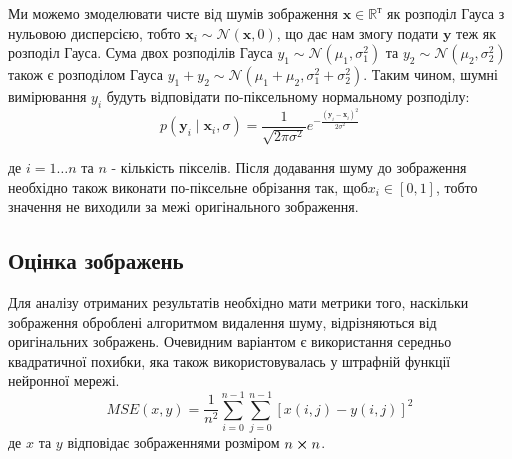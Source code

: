 \documentclass[14pt,a4paper]{extarticle}
\newcounter{e}
\numberwithin{equation}{section}
\numberwithin{figure}{section}
\begin{document}
	Ми можемо змоделювати чисте від шумів зображення $\mathbf{x} \in \mathbb{R}^{т}$ як розподіл Гауса з нульовою дисперсією, тобто $\mathbf{x}_{i} \sim \mathcal{N}(\mathbf{x}, 0)$, що дає нам змогу подати $\mathbf{y}$ теж як розподіл Гауса. Сума двох розподілів Гауса $y_{1} \sim \mathcal{N}\left(\mu_{1}, \sigma_{1}^{2}\right)$ та $y_{2} \sim \mathcal{N}\left(\mu_{2}, \sigma_{2}^{2}\right)$ також є розподілом Гауса $y_{1}+y_{2} \sim \mathcal{N}\left(\mu_{1}+\mu_{2}, \sigma_{1}^{2}+\sigma_{2}^{2}\right)$. Таким чином, шумні  вимірювання $y_{i}$ будуть відповідати по-піксельному нормальному розподілу:
	\begin{equation}
		p\left(\mathbf{y}_{i} \mid \mathbf{x}_{i}, 		\sigma\right)=\frac{1}{\sqrt{2 \pi \sigma^{2}}} e^{-\frac{\left(\mathbf{y}_{i}-\mathbf{x}_{i}\right)^{2}}{2 \sigma^{2}}}
	\end{equation}
	
	де $i = 1\dotsc n$ та $n$ - кількість пікселів. Після додавання шуму до зображення необхідно також виконати по-піксельне обрізання так, щоб$x_i \in [0, 1]$, тобто значення не виходили за межі оригінального зображення.
	
	\subsection{Оцінка зображень}
	Для аналізу отриманих результатів необхідно мати метрики того, наскільки зображення оброблені алгоритмом видалення шуму,  відрізняються від оригінальних зображень. Очевидним варіантом є використання середньо квадратичної похибки, яка також використовувалась у штрафній функції нейронної мережі.
	\begin{equation}
		M S E(x, y) =\frac{1}{n^2} \sum_{i=0}^{n-1} \sum_{j=0}^{n-1}[x(i, j)-y(i, j)]^{2}
	\end{equation}
	де $x$ та $y$ відповідає зображеннями розміром $n \cross n$.
	
\end{document}
